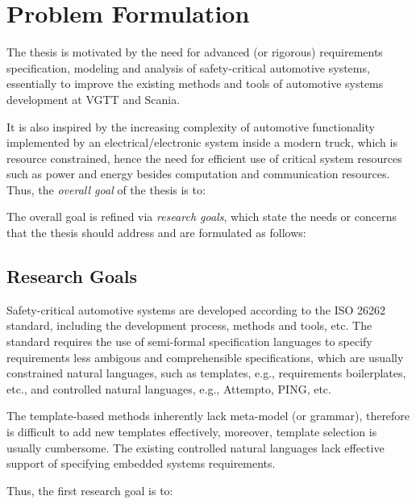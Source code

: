 \chapter{Problem Formulation}
The thesis is motivated by the need for advanced (or rigorous) requirements specification, modeling and analysis of safety-critical automotive systems, essentially to improve the existing methods and tools of automotive systems development at VGTT and Scania.

It is also inspired by the increasing complexity of automotive functionality implemented by an electrical/electronic system inside a modern truck, which is resource constrained, hence the need for efficient use of critical system resources such as power and energy besides computation and communication resources. 
Thus, the \textit{overall goal} of the thesis is to:
\begin{center}
\end{center}

The overall goal is refined via \textit{research goals}, which state the needs or concerns that the thesis should address and are formulated as follows:

\section{Research Goals}\label{research_challenges}
Safety-critical automotive systems are developed according to the ISO 26262 standard, including the development process, methods and tools, etc. The standard requires the use of semi-formal specification languages to specify requirements less ambigous and comprehensible specifications, which are usually constrained natural languages, such as templates, e.g., requirements boilerplates, etc., and controlled natural languages, e.g., Attempto, PING, etc.

The template-based methods inherently lack meta-model (or grammar), therefore is difficult to add new templates effectively, moreover, template selection is usually cumbersome. The existing controlled natural languages lack effective support of specifying embedded systems requirements.

Thus, the first research goal is to:
\setcounter{rgcounter}{1}
\begin{researchgoal}
\end{researchgoal}

